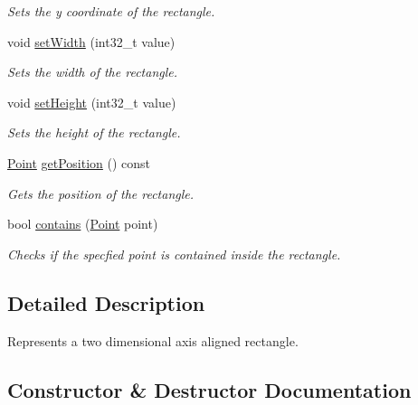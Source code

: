 \begin{DoxyCompactItemize}
\begin{DoxyCompactList}\small\item\em Sets the y coordinate of the rectangle. \end{DoxyCompactList}\item 
void \mbox{\hyperlink{structmath_1_1_rectangle_a4ed00c189e28106206aa239687e3a9ad}{set\+Width}} (int32\+\_\+t value)
\begin{DoxyCompactList}\small\item\em Sets the width of the rectangle. \end{DoxyCompactList}\item 
void \mbox{\hyperlink{structmath_1_1_rectangle_a947a4b1a71debe60b17636e46b93e347}{set\+Height}} (int32\+\_\+t value)
\begin{DoxyCompactList}\small\item\em Sets the height of the rectangle. \end{DoxyCompactList}\item 
\mbox{\hyperlink{struct_point}{Point}} \mbox{\hyperlink{structmath_1_1_rectangle_af1d65a3a3eb6862f4038e29f8e9e5c93}{get\+Position}} () const
\begin{DoxyCompactList}\small\item\em Gets the position of the rectangle. \end{DoxyCompactList}\item 
bool \mbox{\hyperlink{structmath_1_1_rectangle_af00591d871ba4b4eabb3725d8e7e3c03}{contains}} (\mbox{\hyperlink{struct_point}{Point}} point)
\begin{DoxyCompactList}\small\item\em Checks if the specfied point is contained inside the rectangle. \end{DoxyCompactList}\end{DoxyCompactItemize}


\subsection{Detailed Description}
Represents a two dimensional axis aligned rectangle. 



\subsection{Constructor \& Destructor Documentation}
\mbox{\label{structmath_1_1_rectangle_a1335d5ba9662729e62731dbd5de60dae}} 
